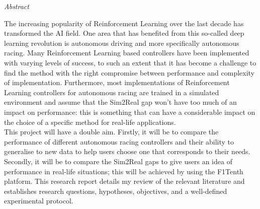 \documentclass[11pt, oneside]{Thesis} %
\begin{document}
\clearpage %




 {\huge{\textit{Abstract}} \par}{} 

The increasing popularity of Reinforcement Learning over the last decade has transformed the AI field. One area that has benefited from this so-called deep learning revolution is autonomous driving and more specifically autonomous racing. Many Reinforcement Learning based controllers have been implemented with varying levels of success, to such an extent that it has become a challenge to find the method with the right compromise between performance and complexity of implementation. Furthermore, most implementations of Reinforcement Learning controllers for autonomous racing are trained in a simulated environment and assume that the Sim2Real gap won't have too much of an impact on performance: this is something that can have a considerable impact on the choice of a specific method for real-life applications.\\
\newline
This project will have a double aim. Firstly, it will be to compare the performance of different autonomous racing controllers and their ability to generalise to new data to help users choose one that corresponds to their needs. Secondly, it will be to compare the Sim2Real gaps to give users an idea of performance in real-life situations; this will be achieved by using the F1Tenth platform. This research report details my review of the relevant literature and establishes research questions, hypotheses, objectives, and a well-defined experimental protocol.
\clearpage %


\end{document}
